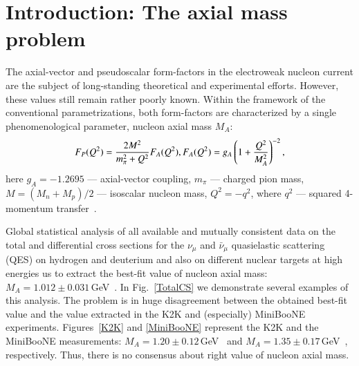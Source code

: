 \section{Introduction: The axial mass problem}
The axial-vector and pseudoscalar form-factors in the electroweak nucleon current are the subject of long-standing theoretical and experimental efforts. However, these values still remain rather poorly known. Within the framework of the conventional parametrizations, both form-factors are characterized by a single phenomenological parameter, nucleon axial mass $M_A$:
\begin{equation}
F_{P}(Q^{2})={}\frac{2M^{2}}{m_{\pi}^{2}+Q^{2}}F_{A}(Q^{2}),\\
F_{A}(Q^{2})={}g_{A}\left(1+\frac{Q^{2}}{M_{A}^{2}}\right)^{-2},
\end{equation}
here $g_{A}=-1.2695$ --- axial-vector coupling, $m_{\pi}$ --- charged pion mass, $M=(M_{n}+M_{p})/2$ --- isoscalar nucleon mass, $Q^{2}=-q^{2}$, where $q^{2}$ --- squared 4-momentum transfer~\cite{Kuzmin:2007kr}.

Global statistical analysis of all available and mutually consistent data on the total and differential cross sections for the $\nu_{\mu}$ and $\bar\nu_{\mu}$ quasielastic scattering (QES) on hydrogen and deuterium and also on different nuclear targets at high energies us to extract the best-fit value of nucleon axial mass: $M_A=1.012\pm0.031$\,GeV~\cite{Kuzmin:2014}. In Fig.~\ref{TotalCS} we demonstrate several examples of this analysis. The problem is in huge disagreement between the obtained best-fit value and the value extracted in the K2K and (especially) MiniBooNE experiments. Figures~\ref{K2K} and \ref{MiniBooNE} represent the K2K and the MiniBooNE measurements: $M_A=1.20\pm0.12$\,GeV~\cite{Gran:2006jn} and $M_{A}=1.35\pm0.17$\,GeV~\cite{AguilarArevalo:2010zc}, respectively. Thus, there is no consensus about right value of nucleon axial mass.

